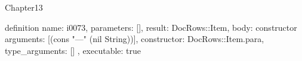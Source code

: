 \begin{lexlean}{Chapter13}
\begin{semanticmodule}
definition{
  name: i0073,
  parameters: [],
  result: DocRows::Item,
  body: constructor{
    arguments: [(cons "---" (nil String))],
    constructor: DocRows::Item.para,
    type_arguments: []
  },
  executable: true
}
\end{semanticmodule}
\end{lexlean}
